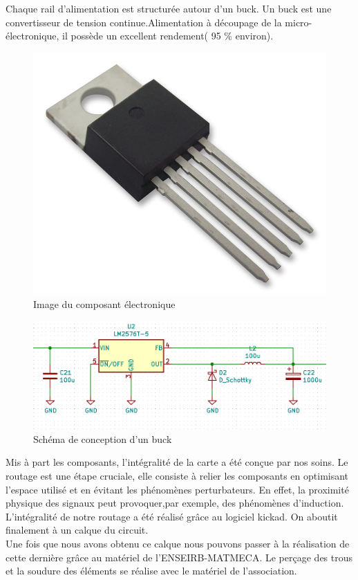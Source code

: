 \documentclass[a4paper,10pt]{article}
\begin{document}
\begin{spacing}{1.5}
Chaque rail d'alimentation est structurée autour d'un buck. Un buck est une convertisseur de tension continue.Alimentation à découpage de la
micro-électronique, il possède un excellent rendement( 95 \% environ).

\begin{multicols}{2}
\begin{figure}[H]
  \center
  \includegraphics[scale=0.1]{buck.jpg}
  \caption{Image du composant électronique}
\end{figure}
\columnbreak
\begin{figure}[H]
  \center
  \includegraphics[scale=0.4]{buck.PNG}
  \caption{Schéma de conception d'un buck}
\end{figure}
\end{multicols}
Mis à part les composants, l'intégralité de la carte a été conçue par nos soins.
Le routage est une étape cruciale, elle consiste à relier les composants en
optimisant l'espace utilisé et en évitant les phénomènes perturbateurs. En
effet, la proximité physique des signaux peut provoquer,par exemple, des
phénomènes d'induction. L'intégralité de notre routage a été réalisé grâce au
logiciel kickad. On aboutit finalement à un calque du circuit. \\
Une fois que nous avons obtenu ce calque nous pouvons passer à la réalisation de
cette dernière grâce au matériel de l'ENSEIRB-MATMECA. Le perçage des trous et
la soudure des éléments se réalise avec le matériel de l'association.


\end{spacing}
\end{document}
